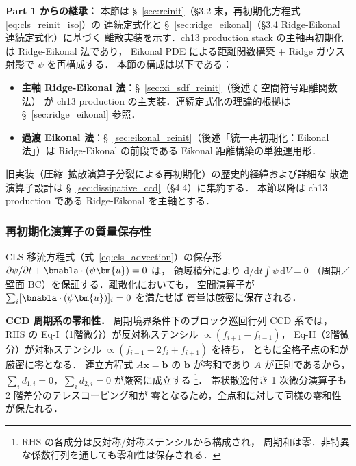 \noindent\textbf{Part 1 からの継承：}
本節は §~\ref{sec:reinit}（§3.2 末，再初期化方程式 \eqref{eq:cls_reinit_iso}）の
連続定式化と §~\ref{sec:ridge_eikonal}（§3.4 Ridge-Eikonal 連続定式化）に基づく
離散実装を示す．ch13 production stack の主軸再初期化は Ridge-Eikonal 法であり，
Eikonal PDE による距離関数構築 + Ridge ガウス射影で $\psi$ を再構成する．
本節の構成は以下である：
\begin{itemize}
  \item \textbf{主軸 Ridge-Eikonal 法}：§~\ref{sec:xi_sdf_reinit}（後述 $\xi$ 空間符号距離関数法）
        が ch13 production の主実装．連続定式化の理論的根拠は §~\ref{sec:ridge_eikonal} 参照．
  \item \textbf{過渡 Eikonal 法}：§~\ref{sec:eikonal_reinit}（後述「統一再初期化：Eikonal 法」）は
        Ridge-Eikonal の前段である Eikonal 距離構築の単独運用形．
\end{itemize}
旧実装（圧縮--拡散演算子分裂による再初期化）の歴史的経緯および詳細な
散逸演算子設計は §~\ref{sec:dissipative_ccd}（§4.4）に集約する．
本節以降は ch13 production である Ridge-Eikonal を主軸とする．

\label{sec:cls_compression_legacy}%
\label{alg:cls_reinit_dccd}%


\subsubsection{再初期化演算子の質量保存性}
\label{sec:dccd_mass_conservation}%

CLS 移流方程式（式~\eqref{eq:cls_advection}）の保存形
$\partial\psi/\partial t + \bnabla\cdot(\psi\bm{u}) = 0$ は，
領域積分により $\mathrm{d}/\mathrm{d}t \int\psi\,\mathrm{d}V = 0$
（周期／壁面 BC）を保証する．離散化においても，
空間演算子が $\sum_i [\bnabla\cdot(\psi\bm{u})]_i = 0$ を満たせば
質量は厳密に保存される．

\textbf{CCD 周期系の零和性．}
周期境界条件下のブロック巡回行列 CCD 系では，
RHS の Eq-I（1階微分）が反対称ステンシル $\propto (f_{i+1} - f_{i-1})$，
Eq-II（2階微分）が対称ステンシル $\propto (f_{i-1} - 2f_i + f_{i+1})$ を持ち，
ともに全格子点の和が厳密に零となる．
連立方程式 $A\bm{x} = \bm{b}$ の $\bm{b}$ が零和であり $A$ が正則であるから，
$\sum_i d_{1,i} = 0$，$\sum_i d_{2,i} = 0$ が厳密に成立する%
\footnote{RHS の各成分は反対称/対称ステンシルから構成され，
周期和は零．非特異な係数行列を通しても零和性は保存される．}．
帯状散逸付き 1 次微分演算子も 2 階差分のテレスコーピング和が
零となるため，全点和に対して同様の零和性が保たれる．

